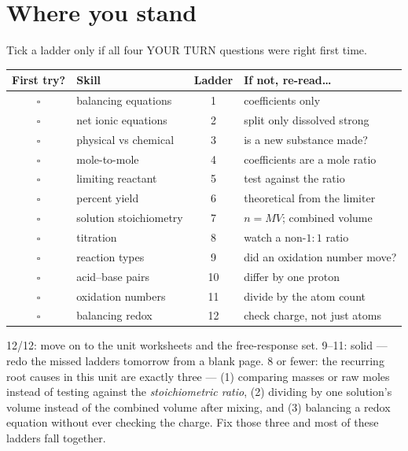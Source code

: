 \documentclass{apchem-worksheet}
\begin{document}
\section*{\sffamily Where you stand}

Tick a ladder only if all four YOUR TURN questions were right first time.

\renewcommand{\arraystretch}{1.30}
\noindent\begin{tabular}{@{}c p{6.0cm} c >{\raggedright\arraybackslash}p{4.9cm}@{}}
\toprule
\textbf{First try?} & \textbf{Skill} & \textbf{Ladder} &
  \textbf{If not, re-read\ldots}\\
\midrule
$\square$ & balancing equations & 1 & coefficients only \\
$\square$ & net ionic equations & 2 & split only dissolved strong \\
$\square$ & physical vs chemical & 3 & is a new substance made? \\
$\square$ & mole-to-mole & 4 & coefficients are a mole ratio \\
$\square$ & limiting reactant & 5 & test against the ratio \\
$\square$ & percent yield & 6 & theoretical from the limiter \\
$\square$ & solution stoichiometry & 7 & $n = MV$; combined volume \\
$\square$ & titration & 8 & watch a non-$1\!:\!1$ ratio \\
$\square$ & reaction types & 9 & did an oxidation number move? \\
$\square$ & acid--base pairs & 10 & differ by one proton \\
$\square$ & oxidation numbers & 11 & divide by the atom count \\
$\square$ & balancing redox & 12 & check charge, not just atoms \\
\bottomrule
\end{tabular}

\begin{apcnote}
12/12: move on to the unit worksheets and the free-response set.
9--11: solid --- redo the missed ladders tomorrow from a blank page.
8 or fewer: the recurring root causes in this unit are exactly three ---
(1) comparing masses or raw moles instead of testing against the
\emph{stoichiometric ratio}, (2) dividing by one solution's volume instead
of the combined volume after mixing, and (3) balancing a redox equation
without ever checking the charge. Fix those three and most of these
ladders fall together.
\end{apcnote}
\end{document}
